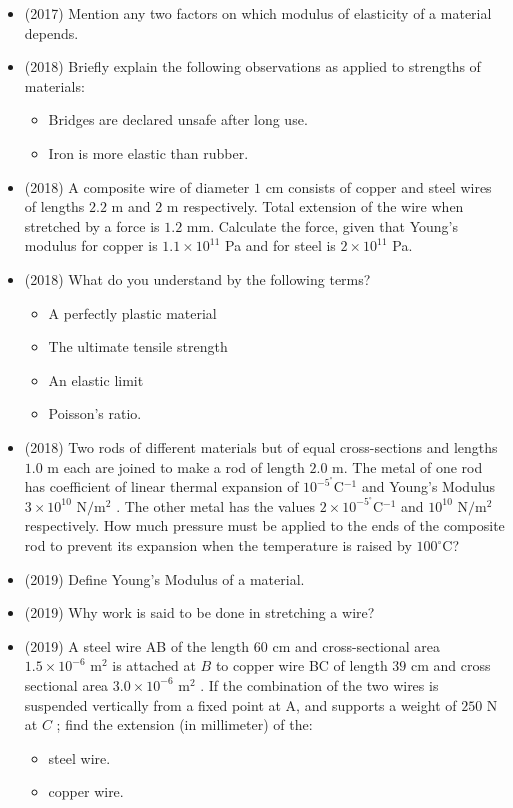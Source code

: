 \documentclass{article}
\begin{document}
\begin{itemize}
\item (2017)  Mention any two factors on which modulus of elasticity of a material depends.
\item (2018)  Briefly explain the following observations as applied to strengths of materials:
 \begin{itemize}
\item Bridges are declared unsafe after long use. 
\item Iron is more elastic than rubber. 
\end{itemize}
\item (2018)  A composite wire of diameter $ 1$ cm consists of copper and steel wires of lengths $ 2.2$ m and $ 2$ m respectively. Total extension of the wire when stretched by a force is $ 1.2$ mm. Calculate the force, given that Young’s modulus for copper is $ 1.1 \times 10^{11}$ Pa and for steel is $ 2 \times 10^{11}$ Pa. 
\item (2018)  What do you understand by the following terms?
 \begin{itemize}
\item A perfectly plastic material 
\item The ultimate tensile strength 
\item An elastic limit 
\item Poisson’s ratio. 
\end{itemize}
\item (2018)  Two rods of different materials but of equal cross-sections and lengths $ 1.0$ m each are joined to make a rod of length $ 2.0$ m. The metal of one rod has coefficient of linear thermal expansion of $ 10^{-5}^{\circ}$C$ ^{-1}$ and Young’s Modulus $ 3 \times 10^{10}$ N$/$m$ ^{2}$ . The other metal has the values $ 2 \times 10^{-5}^{\circ}$C$ ^{-1}$ and $ 10^{10}$ N$/$m$ ^{2}$ respectively. How much pressure must be applied to the ends of the composite rod to prevent its expansion when the temperature is raised by $ 100^{\circ}$C? 
\item (2019)  Define Young’s Modulus of a material. 
\item (2019)  Why work is said to be done in stretching a wire? 
\item (2019)  A steel wire AB of the length $ 60$ cm and cross-sectional area $ 1.5 \times 10^{-6}$ m$ ^{2}$ is attached at $ B$ to copper wire BC of length $ 39$ cm and cross sectional area $ 3.0 \times 10^{-6}$ m$ ^{2}$ . If the combination of the two wires is suspended vertically from a fixed point at A, and supports a weight of $ 250$ N at $ C$ ; find the extension (in millimeter) of the:
 \begin{itemize}
\item steel wire. 
\item copper wire. 
\end{itemize}
\end{itemize}
\end{document}
